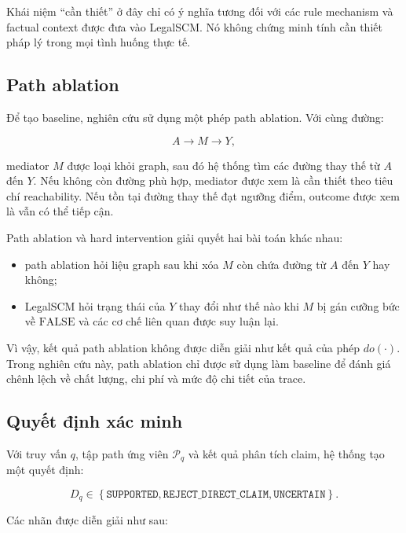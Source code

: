 Khái niệm ``cần thiết'' ở đây chỉ có ý nghĩa tương đối với các rule mechanism
và factual context được đưa vào LegalSCM. Nó không chứng minh tính cần thiết
pháp lý trong mọi tình huống thực tế.

\subsection{Path ablation}

Để tạo baseline, nghiên cứu sử dụng một phép path ablation. Với cùng đường:

\[
A \rightarrow M \rightarrow Y,
\]

mediator \(M\) được loại khỏi graph, sau đó hệ thống tìm các đường thay thế
từ \(A\) đến \(Y\). Nếu không còn đường phù hợp, mediator được xem là cần
thiết theo tiêu chí reachability. Nếu tồn tại đường thay thế đạt ngưỡng
điểm, outcome được xem là vẫn có thể tiếp cận.

Path ablation và hard intervention giải quyết hai bài toán khác nhau:

\begin{itemize}
    \item path ablation hỏi liệu graph sau khi xóa \(M\) còn chứa đường từ
    \(A\) đến \(Y\) hay không;

    \item LegalSCM hỏi trạng thái của \(Y\) thay đổi như thế nào khi
    \(M\) bị gán cưỡng bức về \(\mathrm{FALSE}\) và các cơ chế liên quan
    được suy luận lại.
\end{itemize}

Vì vậy, kết quả path ablation không được diễn giải như kết quả của phép
\(do(\cdot)\). Trong nghiên cứu này, path ablation chỉ được sử dụng làm
baseline để đánh giá chênh lệch về chất lượng, chi phí và mức độ chi tiết
của trace.

\subsection{Quyết định xác minh}

Với truy vấn \(q\), tập path ứng viên \(\mathcal{P}_q\) và kết quả phân tích
claim, hệ thống tạo một quyết định:

\begin{equation}
D_q
\in
\left\{
    \texttt{SUPPORTED},
    \texttt{REJECT\_DIRECT\_CLAIM},
    \texttt{UNCERTAIN}
\right\}.
\end{equation}

Các nhãn được diễn giải như sau:


